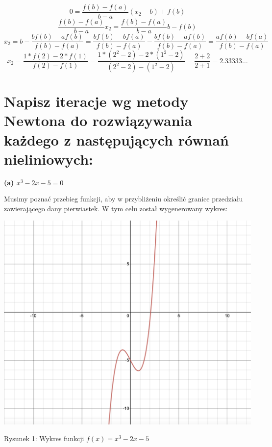 \documentclass[5]{article}
\begin{document}
$$0=\frac{f(b)-f(a)}{b-a}\left(x_{2}-b\right)+f(b)$$
$$\frac{f(b)-f(a)}{b-a} x_{2}=\frac{f(b)-f(a)}{b-a} b-f(b)$$
$$x_{2}=b-\frac{b f(b)-a f(b)}{f(b)-f(a)}=\frac{b f(b)-b f(a)}{f(b)-f(a)}-\frac{b f(b)-a f(b)}{f(b)-f(a)}=\frac{a f(b)-b f(a)}{f(b)-f(a)} $$
$$x_{2}=\frac{1 * f(2)-2 * f(1)}{f(2)-f(1)}=\frac{1 *\left(2^{2}-2\right)-2 *\left(1^{2}-2\right)}{\left(2^{2}-2\right)-\left(1^{2}-2\right)}=\frac{2+2}{2+1}=2.33333 \ldots $$





\section{Napisz iteracje wg metody Newtona do rozwiązywania każdego z następujących równań nieliniowych:}

\textbf{(a) $x^3 - 2x - 5 = 0$} \newline

Musimy poznać przebieg funkcji, aby w przybliżeniu określić granice przedziału zawierającego dany pierwiastek. W tym celu został wygenerowany wykres:

\begin{center}
    \includegraphics[scale=0.4]{lab5_1.png} \par
    \vspace{3mm}
    
\end{center}

\hfil{Rysunek 1: Wykres funkcji $f(x) = x^3 - 2x - 5$} \par
\end{document}

